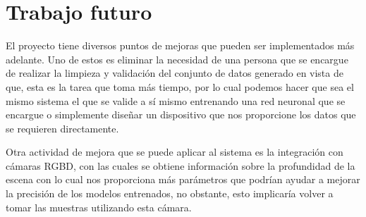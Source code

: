 \section{Trabajo futuro}

El proyecto tiene diversos puntos de mejoras que pueden ser implementados más adelante. Uno de estos es eliminar la necesidad de una persona que se encargue de realizar la limpieza y validación del conjunto de datos generado en vista de que, esta es la tarea que toma más tiempo, por lo cual podemos hacer que sea el mismo sistema el que se valide a sí mismo entrenando una red neuronal que se encargue o simplemente diseñar un dispositivo que nos proporcione los datos que se requieren directamente.

Otra actividad de mejora que se puede aplicar al sistema es la integración con cámaras RGBD, con las cuales se obtiene información sobre la profundidad de la escena con lo cual nos proporciona más parámetros que podrían ayudar a mejorar la precisión de los modelos entrenados, no obstante, esto implicaría volver a tomar las muestras utilizando esta cámara.
